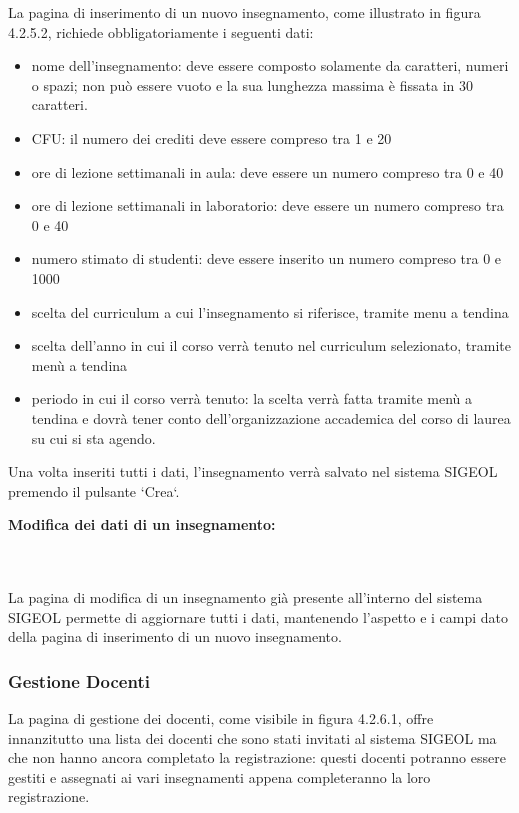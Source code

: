 \documentclass[11pt,a4paper]{article}
\begin{document}
La pagina di inserimento di un nuovo insegnamento, come illustrato in figura 4.2.5.2, richiede obbligatoriamente i seguenti dati:
\begin{itemize}
 \item nome dell'insegnamento: deve essere composto solamente da caratteri, numeri o spazi; non può essere vuoto e la sua lunghezza massima è fissata in 30 caratteri.
 \item CFU: il numero dei crediti deve essere compreso tra 1 e 20
 \item ore di lezione settimanali in aula: deve essere un numero compreso tra 0 e 40
 \item ore di lezione settimanali in laboratorio: deve essere un numero compreso tra 0 e 40
 \item numero stimato di studenti: deve essere inserito un numero compreso tra 0 e 1000
 \item scelta del curriculum a cui l'insegnamento si riferisce, tramite menu a tendina
 \item scelta dell'anno in cui il corso verrà tenuto nel curriculum selezionato, tramite menù a tendina
 \item periodo in cui il corso verrà tenuto: la scelta verrà fatta tramite menù a tendina e dovrà tener conto dell'organizzazione accademica del corso di laurea su cui si sta agendo.
\end{itemize}
Una volta inseriti tutti i dati, l'insegnamento verrà salvato nel sistema SIGEOL premendo il pulsante `Crea`.
\newline \newline
\begin{large}\textbf{Modifica dei dati di un insegnamento:}\end{large}
\\ \\
La pagina di modifica di un insegnamento già presente all'interno del sistema SIGEOL permette di aggiornare tutti i dati, mantenendo l'aspetto e i campi dato della pagina di inserimento di un nuovo insegnamento.
\subsubsection{Gestione Docenti}
La pagina di gestione dei docenti, come visibile in figura 4.2.6.1, offre innanzitutto una lista dei docenti che sono stati invitati al sistema SIGEOL ma che non hanno ancora completato la registrazione: questi docenti potranno essere gestiti e assegnati ai vari insegnamenti appena completeranno la loro registrazione.
\end{document}
